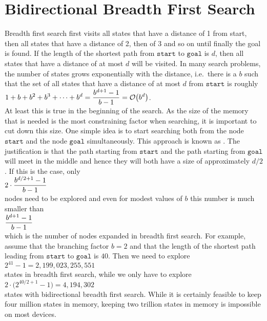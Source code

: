 \section{Bidirectional Breadth First Search}
Breadth first search first visits all states that have a distance of 1 from start, then all
states that have a distance of 2, then of 3 and so on until finally the goal is found.  If the length of the shortest path
from $\texttt{start}$ to $\texttt{goal}$ is $d$, then all states that have a distance of at most $d$ will be
visited.  In many search problems, the number of states grows exponentially with the distance, i.e.~there is
a  $b$ 
such that the set of all states that have a distance of at most $d$
from $\texttt{start}$ is roughly
\\[0.2cm]
\hspace*{1.3cm}
 $\displaystyle 1 + b + b^2 + b^3 + \cdots + b^d = \frac{b^{d+1} - 1}{b - 1} = \mathcal{O}\bigl(b^d\bigr)$.
\\[0.2cm]
At least this is true in the beginning of the search.  As the size of
the memory that is needed is the most constraining factor when searching, it is important to cut down this
size.  One simple idea is to start searching both from the node $\texttt{start}$ and the node $\texttt{goal}$
simultaneously.  This approach is known as .  
The justification is that the path starting from $\texttt{start}$ and the
path starting from $\texttt{goal}$ will meet in the middle and hence they will both have a size of approximately
$d/2$.  If this is the case, only
\\[0.2cm]
\hspace*{1.3cm}
$\displaystyle 2 \cdot \frac{b^{d/2+1} - 1}{b - 1}$
\\[0.2cm]
nodes need to be explored and even for modest values of $b$ this number is much smaller than
\\[0.2cm]
\hspace*{1.3cm}
$\displaystyle\frac{b^{d+1} - 1}{b - 1}$
\\[0.2cm]
which is the number of nodes expanded in breadth first search.  For example, assume that the branching factor
$b = 2$ and that the length of the shortest path leading from $\texttt{start}$ to $\texttt{goal}$
is $40$.  Then we need to explore
\\[0.2cm]
\hspace*{1.3cm}
$2^{41} - 1 = 2,199,023,255,551$
\\[0.2cm]
states in breadth first search, while we only have to explore
\\[0.2cm]
\hspace*{1.3cm}
$2 \cdot \bigl(2^{40/2+1} - 1\bigr) = 4,194,302 $
\\[0.2cm]
states with bidirectional breadth first search.  While it is certainly feasible to keep four million states in memory,
keeping two trillion states in memory is impossible on most devices.

